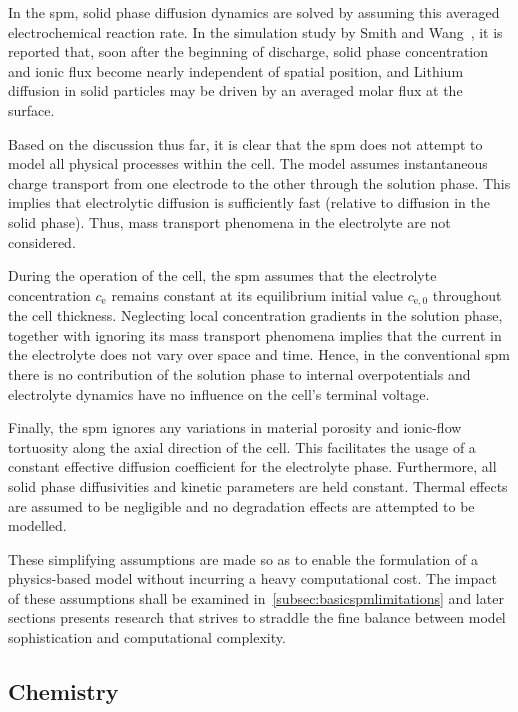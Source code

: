 In the  \gls{spm}, solid phase  diffusion dynamics  are solved by  assuming this
averaged electrochemical  reaction rate.  In the simulation  study by  Smith and
Wang~\cite{Smith2006b},  it  is  reported  that, soon  after  the  beginning  of
discharge, solid phase concentration and ionic flux become nearly independent of
spatial position, and  Lithium diffusion in solid particles may  be driven by an
averaged molar flux at the surface.


Based  on the  discussion thus  far, it  is clear  that the  \gls{spm} does  not
attempt  to model  all physical  processes within  the cell.  The model  assumes
instantaneous  charge transport  from one  electrode  to the  other through  the
solution phase.  This implies that  electrolytic diffusion is  sufficiently fast
(relative to  diffusion in the solid  phase). Thus, mass transport  phenomena in
the electrolyte are not considered.


During the  operation of the  cell, the  \gls{spm} assumes that  the electrolyte
concentration  $c_\text{e}$ remains  constant at  its equilibrium  initial value
$c_{\text{e},0}$ throughout  the cell thickness. Neglecting  local concentration
gradients  in the  solution phase,  together  with ignoring  its mass  transport
phenomena implies that  the current in the electrolyte does  not vary over space
and time. Hence,  in the conventional \gls{spm} there is  no contribution of the
solution  phase to  internal  overpotentials and  electrolyte  dynamics have  no
influence on the cell's terminal voltage.


Finally,  the  \gls{spm}  ignores  any   variations  in  material  porosity  and
ionic-flow tortuosity  along the axial  direction of the cell.  This facilitates
the  usage of  a constant  effective diffusion  coefficient for  the electrolyte
phase. Furthermore,  all solid  phase diffusivities  and kinetic  parameters are
held constant. Thermal  effects are assumed to be negligible  and no degradation
effects are attempted to be modelled.


These simplifying  assumptions are  made so  as to enable  the formulation  of a
physics-based model without incurring a  heavy computational cost. The impact of
these  assumptions shall  be  examined in~\cref{subsec:basicspmlimitations}  and
later  sections presents  research that  strives  to straddle  the fine  balance
between model sophistication and computational complexity.


\subsection{Chemistry}

